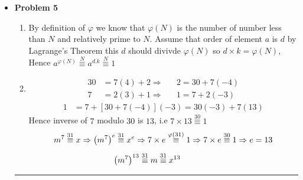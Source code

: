 \documentclass{article}
\begin{document}
\begin{itemize}
	\item{\textcolor{for}{\textbf{Problem 5}}}
		\begin{enumerate}[label=(\alph*)]
		\item
			By definition of $\varphi$ we know that $\varphi(N)$ is the number of number less than $N$ and relatively prime to $N$.	
			Assume that order of element $a$ is $d$ by Lagrange's Theorem this $d$ should divivde $\varphi(N)$ so 
			$d \times k = \varphi(N)$, Hence $a^{\varphi(N)} \stackrel{N}{\equiv} a^{d. k} \stackrel{N}{\equiv}1$
		\item
			\begin{align*}
				30 &= 7(4) + 2 \Rightarrow && 2=30 + 7(-4) \\ 
				7 &= 2(3) + 1 \Rightarrow && 1=7  + 2(-3)
			\end{align*}
			\begin{align*}
				1 &= 7 + \left[ 30 + 7(-4) \right] (-3) = 30(-3) + 7(13)
			\end{align*}
			Hence inverse of $7$ modulo $30$ is $13$, i.e $7 \times 13\stackrel{30}{\equiv}1$\\
			\begin{align*}
				&m^7 \stackrel{31}{\equiv} x \Rightarrow \left(m^{7}\right)^{e} \stackrel{31}{\equiv} x^{e} \Rightarrow
				7 \times e \stackrel{\varphi(31)}{\equiv}1 \Rightarrow  7 \times e \stackrel{30}{\equiv}1 \Rightarrow e = 13\\[5pt]
				&\hspace{2.5cm} \left(m^7\right)^{13} \stackrel{31}{\equiv}m \stackrel{31}{\equiv}x^{13}
			\end{align*}
		\end{enumerate}
		\hrule


\end{itemize}
\end{document}
